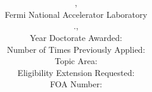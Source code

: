 

\title{\color{NALblue} \bf{\large{\Title}\vspace{-\baselineskip}}}
\author{\Name, \JobTitle
\\ Fermi National Accelerator Laboratory
\\ \PhoneFirst.\PhoneLast, \EmailFirst\EmailLast
\\Year Doctorate Awarded: \YearPhD
\\Number of Times Previously Applied: \NumPrev
\\ Topic Area: \TopicArea
\\Eligibility Extension Requested: \ExtensionReq
\\FOA Number:  \FOANumber}
